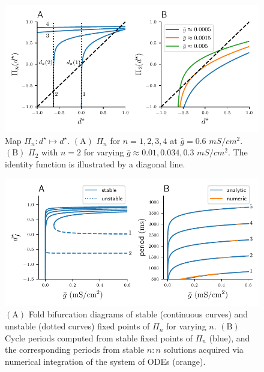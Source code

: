 \documentclass[utf8]{frontiersFPHY} %
\newcommand{\gbar}{\bar g}
\begin{document}
\begin{figure}[h!]
  \centering
  \includegraphics{Pn-map}
  \caption{Map $\Pi_{n}:d^{\star}\mapsto d^{\star}$. $\bm{\mathrm{(A)}}$ $\Pi_{n}$ for $n=1,2,3,4$
  at $\gbar=0.6$ $\si{mS/cm^{2}}$. $\bm{\mathrm{(B)}}$ $\Pi_{2}$ with $n=2$ for
  varying $\gbar \approx 0.01, 0.034, 0.3$ $\si{mS/cm^{2}}$. The identity function is
  illustrated by a diagonal line.~\label{fig:Pn-map}}
\end{figure}

\begin{figure}[h!]
  \centering
  \includegraphics{folds}
  \caption{$\bm{\mathrm{(A)}}$ Fold bifurcation diagrams of stable (continuous curves)
    and unstable (dotted curves) fixed points of $\Pi_{n}$ for varying $n$.
    $\bm{\mathrm{(B)}}$ Cycle periods computed from stable fixed points of $\Pi_{n}$ (blue), and the corresponding periods from stable $n:n$ solutions acquired via numerical integration of the system of ODEs
    (orange).~\label{fig:folds}}
\end{figure}
\end{document}
